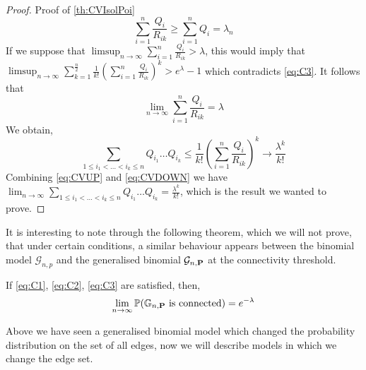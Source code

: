 \begin{proof}{Proof of \ref{th:CVIsolPoi}}
\begin{equation}
	\sum_{i=1}^n \frac{Q_i}{R_{ik}} \geq \sum_{i=1}^n Q_i = \lambda_n
	\end{equation}
	If we suppose that $\limsup_{n\to \infty} \sum_{i=1}^n \frac{Q_i}{R_{ik}} > \lambda$, 
	this would imply that $\limsup_{n\to \infty} \sum_{k=1}^{\frac{n}{2}} \frac{1}{k!} (\sum_{i=1}^n \frac{Q_i}{R_{ik}})^k > e^{\lambda} - 1$
	which contradicts \eqref{eq:C3}.
	It follows that 
	\begin{equation}
	\lim_{n\to\infty} \sum_{i=1}^n \frac{Q_i}{R_{ik}} = \lambda
	\end{equation}
	We obtain, 
	\begin{equation}\label{eq:CVUP}
	\sum_{1 \leq i_1 < \ldots < i_k \leq n} Q_{i_1} \ldots Q_{i_k} \leq \frac{1}{k!} (\sum_{i=1}^n \frac{Q_i}{R_{ik}})^k \longrightarrow \frac{\lambda^k}{k!}
	\end{equation}
	Combining \eqref{eq:CVUP} and \eqref{eq:CVDOWN} we have $\lim_{n\to\infty} \sum_{1 \leq i_1 < \ldots <i_k \leq n} Q_{i_1} \ldots Q_{i_k} = \frac{\lambda^k}{k!}$, which is the result we wanted to prove.
\end{proof}
It is interesting to note through the following theorem, which we will not prove, that under certain conditions, a similar behaviour appears between the binomial model $\mathcal{G}_{n,p}$ and the generalised binomial $\mathcal{G}_{n, \bold{P}}$ at the connectivity threshold.
\begin{theorem}
	If \eqref{eq:C1}, \eqref{eq:C2}, \eqref{eq:C3} are satisfied, then,
	\begin{equation}
		\lim_{n\to \infty} \mathbb{P}(\mathbb{G}_{n, \bold{P}} \text{ is connected}) = e^{-\lambda}
	\end{equation}
\end{theorem}

Above we have seen a generalised binomial model which changed the probability distribution on the set of all edges, now we will describe models in which we change the edge set.
